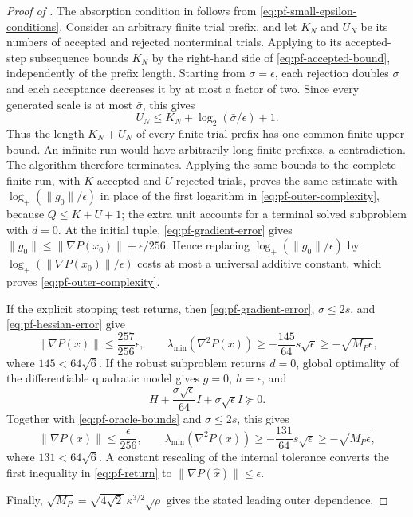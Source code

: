 \documentclass{article}
\begin{document}
\begin{proof}[Proof of ]
The absorption condition in  follows
from \eqref{eq:pf-small-epsilon-conditions}.  Consider an arbitrary
finite trial prefix, and let $K_N$ and $U_N$ be its numbers of accepted
and rejected nonterminal trials.  Applying
 to its accepted-step subsequence
bounds $K_N$ by the right-hand side of
\eqref{eq:pf-accepted-bound}, independently of the prefix length.
Starting from $\sigma=\epsilon$, each rejection doubles $\sigma$ and
each acceptance decreases it by at most a factor of two.  Since every
generated scale is at most $\bar\sigma$, this gives
\[
 U_N\le K_N+\log_2(\bar\sigma/\epsilon)+1.
\]
Thus the length $K_N+U_N$ of every finite trial prefix has one common
finite upper bound.  An infinite run would have arbitrarily long
finite prefixes, a contradiction.  The algorithm therefore
terminates.  Applying the same bounds to the complete finite run, with
$K$ accepted and $U$ rejected trials, proves the same estimate with
$\log_+(\|g_0\|/\epsilon)$ in place of the first logarithm in
\eqref{eq:pf-outer-complexity}, because $Q\le K+U+1$; the extra unit
accounts for a terminal solved subproblem with $d=0$.  At the initial
tuple, \eqref{eq:pf-gradient-error} gives
$\|g_0\|\le\|\nabla P(x_0)\|+\epsilon/256$.  Hence replacing
$\log_+(\|g_0\|/\epsilon)$ by
$\log_+(\|\nabla P(x_0)\|/\epsilon)$ costs at most a universal
additive constant, which proves \eqref{eq:pf-outer-complexity}.

If the explicit stopping test returns, then
\eqref{eq:pf-gradient-error}, $\sigma\le2s$, and
\eqref{eq:pf-hessian-error} give
\[
 \|\nabla P(x)\|\le\frac{257}{256}\epsilon,
 \qquad
 \lambda_{\min}(\nabla^2P(x))
 \ge-\frac{145}{64}s\sqrt\epsilon
 \ge-\sqrt{M_P\epsilon},
\]
where $145<64\sqrt6$.  If the robust
subproblem returns $d=0$, global optimality of the differentiable
quadratic model gives $g=0$, $h=\epsilon$, and
\[
 H+\frac{\sigma\sqrt\epsilon}{64}I
   +\sigma\sqrt\epsilon I
 \succeq0.
\]
Together with \eqref{eq:pf-oracle-bounds} and $\sigma\le2s$, this gives
\[
 \|\nabla P(x)\|\le\frac\epsilon{256},
 \qquad
 \lambda_{\min}(\nabla^2P(x))
 \ge-\frac{131}{64}s\sqrt\epsilon
 \ge-\sqrt{M_P\epsilon},
\]
where $131<64\sqrt6$.  A constant rescaling of the internal
tolerance converts the first inequality in \eqref{eq:pf-return} to
$\|\nabla P(\widehat x)\|\le\epsilon$.

Finally,
$\sqrt{M_P}=\sqrt{4\sqrt2}\,\kappa^{3/2}\sqrt\rho$ gives the stated
leading outer dependence.
\end{proof}
\end{document}
